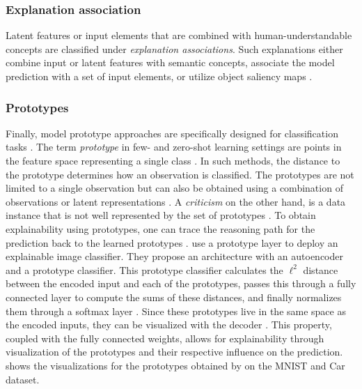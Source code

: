 \subsubsection{Explanation association}
Latent features or input elements that are combined with human-understandable concepts are classified under \emph{explanation associations}. Such explanations either combine input or latent features with semantic concepts, associate the model prediction with a set of input elements, or utilize object saliency maps \citep{xie2020explainable}.

\subsubsection{Prototypes}
\label{sec:prototypes}

Finally, model prototype approaches are specifically designed for classification tasks \citep{Bien2011, KimRS14, PriebeMDS03, wu2017prototypal}. The term \emph{prototype} in few- and zero-shot learning settings are points in the feature space representing a single class \citep{LiLCR18}. In such methods, the distance to the prototype determines how an observation is classified. The prototypes are not limited to a single observation but can also be obtained using a combination of observations or latent representations \citep{xie2020explainable}. A \emph{criticism} on the other hand, is a data instance that is not well represented by the set of prototypes \citep{molnar2019}. To obtain explainability using prototypes, one can trace the reasoning path for the prediction back to the learned prototypes \citep{xie2020explainable}. \citet{LiLCR18} use a prototype layer to deploy an explainable image classifier. They propose an architecture with an autoencoder and a prototype classifier. This prototype classifier calculates the $\ell^2$ distance between the encoded input and each of the prototypes, passes this through a fully connected layer to compute the sums of these distances, and finally normalizes them through a softmax layer \citep{LiLCR18}. Since these prototypes live in the same space as the encoded inputs, they can be visualized with the decoder \citep{LiLCR18}. This property, coupled with the fully connected weights, allows for explainability through visualization of the prototypes and their respective influence on the prediction.  shows the visualizations for the prototypes obtained by \citet{LiLCR18} on the MNIST \citep{lecun-mnisthandwrittendigit-2010} and Car \citep{FidlerDU12} dataset.

